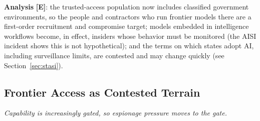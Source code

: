 \documentclass[11pt,letterpaper]{article}
\begin{document}
\textbf{Analysis} \textbf{[E]}: the trusted-access population now includes classified government environments, so the people and contractors who run frontier models there are a first-order recruitment and compromise target; models embedded in intelligence workflows become, in effect, insiders whose behavior must be monitored (the AISI incident shows this is not hypothetical); and the terms on which states adopt AI, including surveillance limits, are contested and may change quickly (see Section~\ref{sec:stasi}).

\subsection{Frontier Access as Contested Terrain}

\textit{Capability is increasingly gated, so espionage pressure moves to the gate.}
\end{document}
